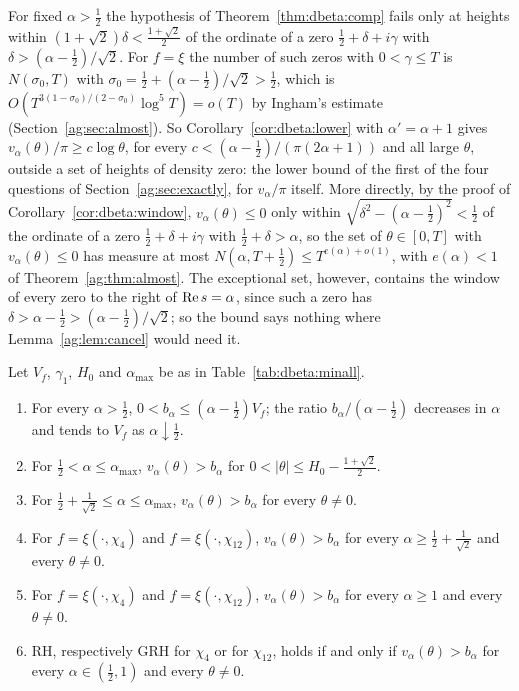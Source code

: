 \begin{remark}\label{rem:dbeta:average}
For fixed $\alpha>\frac12$ the hypothesis of Theorem~\ref{thm:dbeta:comp} fails only at heights within $(1+\sqrt2)\delta<\frac{1+\sqrt2}2$ of the ordinate of a zero $\frac12+\delta+i\gamma$ with $\delta>(\alpha-\frac12)/\sqrt2$. For $f=\xi$ the number of such zeros with $0<\gamma\le T$ is $N(\sigma_0,T)$ with $\sigma_0=\frac12+(\alpha-\frac12)/\sqrt2>\frac12$, which is $O(T^{3(1-\sigma_0)/(2-\sigma_0)}\log^5T)=o(T)$ by Ingham's estimate \cite{Ingham40} (Section~\ref{ag:sec:almost}). So Corollary~\ref{cor:dbeta:lower} with $\alpha'=\alpha+1$ gives $v_\alpha(\theta)/\pi\ge c\log\theta$, for every $c<(\alpha-\frac12)/(\pi(2\alpha+1))$ and all large $\theta$, outside a set of heights of density zero: the lower bound of the first of the four questions of Section~\ref{ag:sec:exactly}, for $v_\alpha/\pi$ itself. More directly, by the proof of Corollary~\ref{cor:dbeta:window}, $v_\alpha(\theta)\le0$ only within $\sqrt{\delta^2-(\alpha-\frac12)^2}<\frac12$ of the ordinate of a zero $\frac12+\delta+i\gamma$ with $\frac12+\delta>\alpha$, so the set of $\theta\in[0,T]$ with $v_\alpha(\theta)\le0$ has measure at most $N(\alpha,T+\frac12)\le T^{e(\alpha)+o(1)}$, with $e(\alpha)<1$ of Theorem~\ref{ag:thm:almost}. The exceptional set, however, contains the window of every zero to the right of $\operatorname{Re} s=\alpha$, since such a zero has $\delta>\alpha-\frac12>(\alpha-\frac12)/\sqrt2$; so the bound says nothing where Lemma~\ref{ag:lem:cancel} would need it.
\end{remark}

\begin{theorem}\label{thm:dbeta:minall}
Let $V_f$, $\gamma_1$, $H_0$ and $\alpha_{\max}$ be as in Table~\ref{tab:dbeta:minall}.
\begin{enumerate}
\item[(i)] For every $\alpha>\frac12$, $0<b_\alpha\le(\alpha-\frac12)V_f$; the ratio $b_\alpha/(\alpha-\frac12)$ decreases in $\alpha$ and tends to $V_f$ as $\alpha\downarrow\frac12$.
\item[(ii)] For $\frac12<\alpha\le\alpha_{\max}$, $v_\alpha(\theta)>b_\alpha$ for $0<|\theta|\le H_0-\frac{1+\sqrt2}2$.
\item[(iii)] For $\frac12+\frac1{\sqrt2}\le\alpha\le\alpha_{\max}$, $v_\alpha(\theta)>b_\alpha$ for every $\theta\ne0$.
\item[(iv)] For $f=\xi(\cdot,\chi_4)$ and $f=\xi(\cdot,\chi_{12})$, $v_\alpha(\theta)>b_\alpha$ for every $\alpha\ge\frac12+\frac1{\sqrt2}$ and every $\theta\ne0$.
\item[(v)] For $f=\xi(\cdot,\chi_4)$ and $f=\xi(\cdot,\chi_{12})$, $v_\alpha(\theta)>b_\alpha$ for every $\alpha\ge1$ and every $\theta\ne0$.
\item[(vi)] RH, respectively GRH for $\chi_4$ or for $\chi_{12}$, holds if and only if $v_\alpha(\theta)>b_\alpha$ for every $\alpha\in(\frac12,1)$ and every $\theta\ne0$.
\end{enumerate}
\end{theorem}


